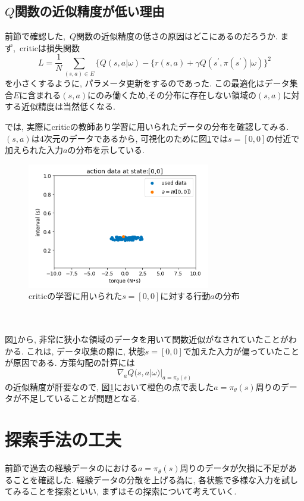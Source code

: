 \documentclass[dvipdfmx]{ampmt}
\begin{document}
\subsection{$Q$関数の近似精度が低い理由}
前節で確認した,~$Q$関数の近似精度の低さの原因はどこにあるのだろうか. まず,~criticは損失関数
\[L=\frac{1}{N}\sum_{(s,a)\in E}\{Q(s,a|\omega) - \{r(s,a)+\gamma Q(s^{\prime},\pi(s^{\prime})|\omega)\}^2\]
を小さくするように, パラメータ更新をするのであった. この最適化はデータ集合$E$に含まれる$(s,a)$にのみ働くため,その分布に存在しない領域の$(s,a)$に対する近似精度は当然低くなる.\par
では, 実際にcriticの教師あり学習に用いられたデータの分布を確認してみる. $(s,a)$は4次元のデータであるから, 可視化のために図\ref{data_distribution}では$s=[0,0]$の付近で加えられた入力$a$の分布を示している.
\begin{figure}[h]
	\centering
 	\includegraphics[width=8cm]{data_distribution.png}
 	\caption{criticの学習に用いられた$s=[0,0]$に対する行動$a$の分布} \label{data_distribution}
\end{figure}\\\\
図\ref{data_distribution}から, 非常に狭小な領域のデータを用いて関数近似がなされていたことがわかる. これは, データ収集の際に, 状態$s=[0, 0]$で加えた入力が偏っていたことが原因である. 方策勾配の計算には
\[\nabla_{a} Q(s,a|\omega)|_{a=\pi_{\theta}(s)}\]
の近似精度が肝要なので, 図\ref{data_distribution}において橙色の点で表した$a=\pi_{\theta}(s)$周りのデータが不足していることが問題となる.



\section{探索手法の工夫}
前節で過去の経験データのにおける$a=\pi_{\theta}(s)$周りのデータが欠損に不足があることを確認した. 経験データの分散を上げる為に, 各状態で多様な入力を試してみることを探索といい, まずはその探索について考えていく.
\end{document}
